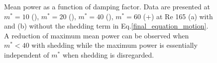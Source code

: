 \begin{figure}
\begin{picture}
    
 

     

  \end{picture}
  

  \caption{Mean power as a function of damping factor. Data are presented at $m^*=10$ (), $m^*=20$ (), $m^*=40$ (), $m^*=60$ (+) at Re 165 (a) with and (b) without the shedding term in Eq.\ref{final_equation_motion}. A reduction of maximum mean power can be observed when $m^*<40$ with shedding while the maximum power is essentially independent of $m^*$ when shedding is disregarded.}
    \label{fig:m_star_collapsed}
\end{figure}



